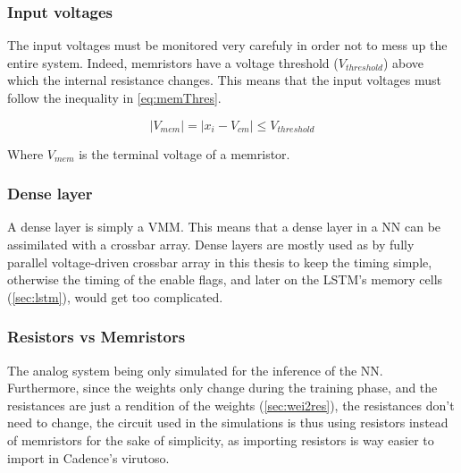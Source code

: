 \subsubsection{Input voltages}

The input voltages must be monitored very carefuly in order not to mess up the entire system. Indeed, memristors have a voltage threshold ($V_{threshold}$) above which the internal resistance changes. %
This means that the input voltages must follow the inequality in \cref{eq:memThres}.

\begin{equation}\label{eq:memThres}
  |V_{mem}|= |x_i-V_{cm}|\le V_{threshold}
\end{equation}

Where $V_{mem}$ is the terminal voltage of a memristor.

\subsubsection{Dense layer}

A dense layer is simply a \ac{VMM}. This means that a dense layer in a \ac{NN} can be assimilated with a crossbar array. Dense layers are mostly used as by fully parallel voltage-driven crossbar array in this thesis to keep the timing simple, otherwise the timing of the enable flags, and later on the \ac{LSTM}'s memory cells (\cref{sec:lstm}), would get too complicated.

\subsubsection{Resistors vs Memristors}

The analog system being only simulated for the inference of the \ac{NN}. Furthermore, since the weights only change during the training phase, and the resistances are just a rendition of the weights (\cref{sec:wei2res}), the resistances don't need to change, the circuit used in the simulations is thus using resistors instead of memristors for the sake of simplicity, as importing resistors is way easier to import in Cadence's virutoso.
